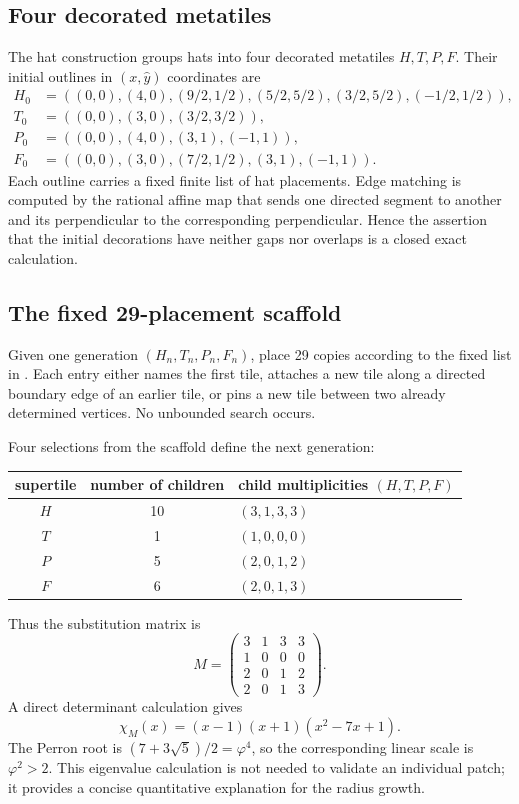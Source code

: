 \documentclass[11pt]{article}
\begin{document}
\subsection{Four decorated metatiles}
The hat construction groups hats into four decorated metatiles $H,T,P,F$.  Their initial
outlines in $(x,\widehat y)$ coordinates are
\begin{align*}
H_0&=((0,0),(4,0),(9/2,1/2),(5/2,5/2),(3/2,5/2),(-1/2,1/2)),\\
T_0&=((0,0),(3,0),(3/2,3/2)),\\
P_0&=((0,0),(4,0),(3,1),(-1,1)),\\
F_0&=((0,0),(3,0),(7/2,1/2),(3,1),(-1,1)).
\end{align*}
Each outline carries a fixed finite list of hat placements.  Edge matching is computed by
the rational affine map that sends one directed segment to another and its perpendicular
to the corresponding perpendicular.  Hence the assertion that the initial decorations
have neither gaps nor overlaps is a closed exact calculation.

\subsection{The fixed 29-placement scaffold}
Given one generation $(H_n,T_n,P_n,F_n)$, place 29 copies according to the fixed list in
.  Each entry either names the first tile,
attaches a new tile along a directed boundary edge of an earlier tile, or pins a new tile
between two already determined vertices.  No unbounded search occurs.

Four selections from the scaffold define the next generation:
\begin{center}
\begin{tabular}{ccl}
\toprule
supertile & number of children & child multiplicities $(H,T,P,F)$\\
\midrule
$H$ & 10 & $(3,1,3,3)$\\
$T$ & 1  & $(1,0,0,0)$\\
$P$ & 5  & $(2,0,1,2)$\\
$F$ & 6  & $(2,0,1,3)$\\
\bottomrule
\end{tabular}
\end{center}
Thus the substitution matrix is
\begin{equation}\label{eq:substmatrix}
 M=\begin{pmatrix}
 3&1&3&3\\
 1&0&0&0\\
 2&0&1&2\\
 2&0&1&3
 \end{pmatrix}.
\end{equation}
A direct determinant calculation gives
\[
 \chi_M(x)=(x-1)(x+1)(x^2-7x+1).
\]
The Perron root is $(7+3\sqrt5)/2=\varphi^4$, so the corresponding linear scale is
$\varphi^2>2$.  This eigenvalue calculation is not needed to validate an individual
patch; it provides a concise quantitative explanation for the radius growth.
\end{document}

